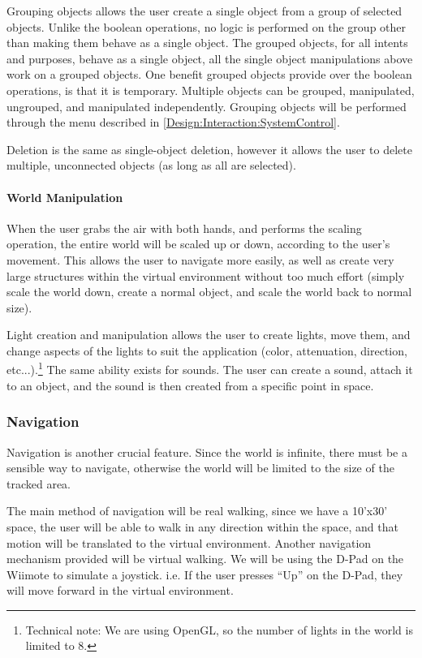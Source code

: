 Grouping objects allows the user create a single object from a group of selected objects.
Unlike the boolean operations, no logic is performed on the group other than making them behave as a single object.
The grouped objects, for all intents and purposes, behave as a single object, all the single object manipulations above work on a grouped objects.
One benefit grouped objects provide over the boolean operations, is that it is temporary.
Multiple objects can be grouped, manipulated, ungrouped, and manipulated independently.
Grouping objects will be performed through the menu described in \ref{Design:Interaction:SystemControl}.

Deletion is the same as single-object deletion, however it allows the user to delete multiple, unconnected objects (as long as all are selected).

\paragraph{World Manipulation}
When the user grabs the air with both hands, and performs the scaling operation, the entire world will be scaled up or down, according to the user's movement.
This allows the user to navigate more easily, as well as create very large structures within the virtual environment without too much effort (simply scale the world down, create a normal object, and scale the world back to normal size).

Light creation and manipulation allows the user to create lights, move them, and change aspects of the lights to suit the application (color, attenuation, direction, etc...).\footnote{Technical note: We are using OpenGL, so the number of lights in the world is limited to 8.}
The same ability exists for sounds.
The user can create a sound, attach it to an object, and the sound is then created from a specific point in space.

\subsubsection{Navigation}
\label{Design:Interaction:Navigation}
Navigation is another crucial feature.
Since the world is infinite, there must be a sensible way to navigate, otherwise the world will be limited to the size of the tracked area.

The main method of navigation will be real walking, since we have a 10'x30' space, the user will be able to walk in any direction within the space, and that motion will be translated to the virtual environment.
Another navigation mechanism provided will be virtual walking.
We will be using the D-Pad on the Wiimote to simulate a joystick.
i.e. If the user presses ``Up'' on the D-Pad, they will move forward in the virtual environment.

